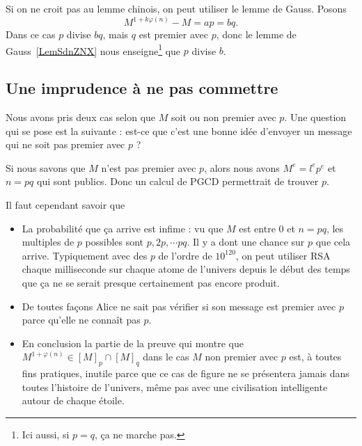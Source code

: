 Si on ne croit pas au lemme chinois, on peut utiliser le lemme de Gauss. Posons
\begin{equation}
    M^{1+k\varphi(n)}-M=ap=bq.
\end{equation}
Dans ce cas \( p\) divise \( bq\), mais \( q\) est premier avec \( p\), donc le lemme de Gauss~\ref{LemSdnZNX} nous enseigne\footnote{Ici aussi, si \( p=q\), ça ne marche pas.} que \( p\) divise \( b\).

\subsection{Une imprudence à ne pas commettre}

Nous avons pris deux cas selon que \( M\) soit ou non premier avec \( p\). Une question qui se pose est la suivante : est-ce que c'est une bonne idée d'envoyer un message qui ne soit pas premier avec \( p\) ?

Si nous savons que \( M\) n'est pas premier avec \( p\), alors nous avons \( M^e=l^ep^e\) et \( n=pq\) qui sont publics. Donc un calcul de PGCD permettrait de trouver \( p\).

Il faut cependant savoir que \label{PageAKTBooMDeQxY}
\begin{itemize}
    \item La probabilité que ça arrive est infime : vu que \( M\) est entre \( 0\) et \( n=pq\), les multiples de \( p\) possibles sont \( p,2p,\cdots pq\). Il y a dont une chance sur \( p\) que cela arrive. Typiquement avec des \( p\) de l'ordre de \( 10^{120}\), on peut utiliser RSA chaque milliseconde sur chaque atome de l'univers depuis le début des temps que ça ne se serait presque certainement pas encore produit.
    \item
        De toutes façons Alice ne sait pas vérifier si son message est premier avec \( p\) parce qu'elle ne connaît pas \( p\).
    \item
        En conclusion la partie de la preuve qui montre que \( M^{1+\varphi(n)}\in [M]_p\cap[M]_q\) dans le cas \( M\) non premier avec \( p\) est, à toutes fins pratiques, inutile parce que ce cas de figure ne se présentera jamais dans toutes l'histoire de l'univers, même pas avec une civilisation intelligente autour de chaque étoile.
\end{itemize}

